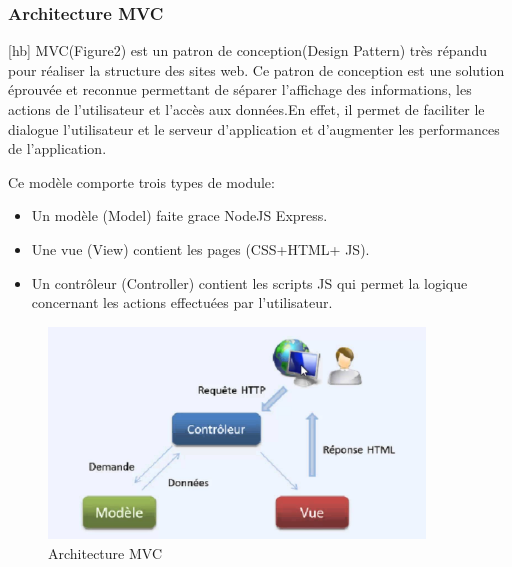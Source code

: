 \subsubsection{\textbf{Architecture MVC}}[hb]
MVC(Figure2) est un patron de conception(Design Pattern) très répandu pour réaliser la structure des sites web. Ce patron de conception est une solution éprouvée et reconnue permettant de séparer l’affichage des informations, les actions de l’utilisateur et l’accès aux données.En effet, il permet de faciliter le dialogue l’utilisateur et le serveur d’application et d’augmenter les performances de l’application.\par
 Ce modèle comporte trois types de module:\par
 \begin{itemize}
     \item Un modèle (Model) faite grace NodeJS Express.
     \item Une vue (View) contient les pages (CSS+HTML+ JS).
     \item Un contrôleur (Controller) contient les scripts JS qui permet la logique concernant les actions effectuées par l'utilisateur.
 \end{itemize}
 \begin{figure}[hb]
     \centering
     \includegraphics[width=10cm]{images/mvc.png}
     \caption{Architecture MVC}
     \label{fig:my_label}
 \end{figure}